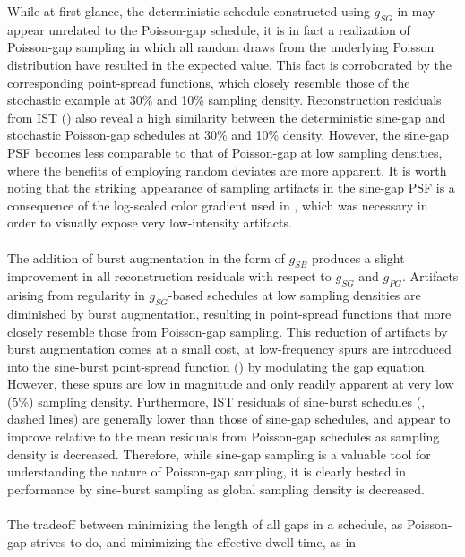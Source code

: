 \begin{doublespace}
While at first glance, the deterministic schedule constructed using $g_{SG}$
in  may appear unrelated to the Poisson-gap
schedule, it is in fact a realization of Poisson-gap sampling in which all
random draws from the underlying Poisson distribution have resulted in the
expected value. This fact is corroborated by the corresponding point-spread
functions, which closely resemble those of the stochastic example at 30\% and
10\% sampling density. Reconstruction residuals from IST
() also reveal a high
similarity between the deterministic sine-gap and stochastic Poisson-gap
schedules at 30\% and 10\% density. However, the sine-gap PSF becomes less
comparable to that of Poisson-gap at low sampling densities, where the
benefits of employing random deviates are more apparent. It is worth noting
that the striking appearance of sampling artifacts in the sine-gap PSF is a
consequence of the log-scaled color gradient used in ,
which was necessary in order to visually expose very low-intensity artifacts.
\\\\
The addition of burst augmentation in the form of $g_{SB}$ produces a slight
improvement in all reconstruction residuals with respect to $g_{SG}$ and
$g_{PG}$. Artifacts arising from regularity in $g_{SG}$-based schedules at
low sampling densities are diminished by burst augmentation, resulting in
point-spread functions that more closely resemble those from Poisson-gap
sampling. This reduction of artifacts by burst augmentation comes at a small
cost, at low-frequency spurs are introduced into the sine-burst point-spread
function () by modulating the gap equation.
However, these spurs are low in magnitude and only readily apparent at very
low (5\%) sampling density. Furthermore, IST residuals of sine-burst schedules
(, dashed lines) are generally lower than
those of sine-gap schedules, and appear to improve relative to the mean
residuals from Poisson-gap schedules as sampling density is decreased.
Therefore, while sine-gap sampling is a valuable tool for understanding
the nature of Poisson-gap sampling, it is clearly bested in performance
by sine-burst sampling as global sampling density is decreased.
\\\\
The tradeoff between minimizing the length of all gaps in a schedule, as
Poisson-gap strives to do, and minimizing the effective dwell time, as in

\end{doublespace}
